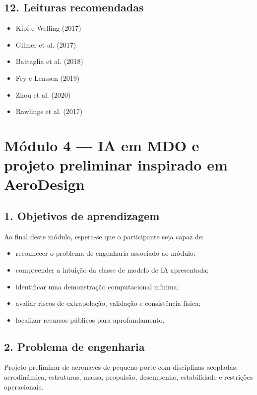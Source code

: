 \documentclass[
  brazilian,
  a4paper,
  DIV=11,
  numbers=noendperiod]{scrreprt}
\providecommand{\tightlist}{%
  \setlength{\itemsep}{0pt}\setlength{\parskip}{0pt}}
\begin{document}
\section{12. Leituras recomendadas}\label{leituras-recomendadas-2}

\begin{itemize}
\tightlist
\item
  Kipf e Welling (2017)
\item
  Gilmer et al. (2017)
\item
  Battaglia et al. (2018)
\item
  Fey e Lenssen (2019)
\item
  Zhou et al. (2020)
\item
  Rawlings et al. (2017)
\end{itemize}

\chapter{Módulo 4 --- IA em MDO e projeto preliminar inspirado em
AeroDesign}\label{muxf3dulo-4-ia-em-mdo-e-projeto-preliminar-inspirado-em-aerodesign}

\section{1. Objetivos de
aprendizagem}\label{objetivos-de-aprendizagem-3}

Ao final deste módulo, espera-se que o participante seja capaz de:

\begin{itemize}
\tightlist
\item
  reconhecer o problema de engenharia associado ao módulo;
\item
  compreender a intuição da classe de modelo de IA apresentada;
\item
  identificar uma demonstração computacional mínima;
\item
  avaliar riscos de extrapolação, validação e consistência física;
\item
  localizar recursos públicos para aprofundamento.
\end{itemize}

\section{2. Problema de engenharia}\label{problema-de-engenharia-3}

Projeto preliminar de aeronaves de pequeno porte com disciplinas
acopladas: aerodinâmica, estruturas, massa, propulsão, desempenho,
estabilidade e restrições operacionais.
\end{document}
